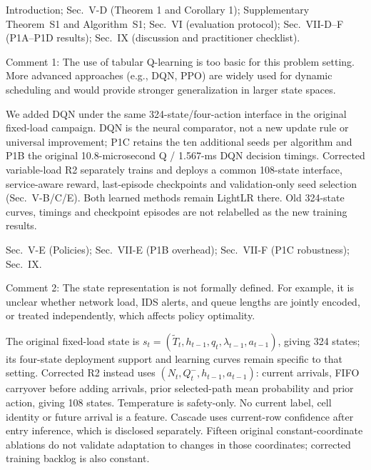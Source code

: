 \documentclass[10pt,a4paper]{article}
\begin{document}
\begin{wherebox}
Introduction; Sec.~V-D (Theorem 1 and Corollary 1); Supplementary Theorem~S1 and Algorithm~S1; Sec.~VI (evaluation protocol); Sec.~VII-D--F (P1A--P1D results); Sec.~IX (discussion and practitioner checklist).
\end{wherebox}

\begin{rcommentbox}
Comment 1: The use of tabular Q-learning is too basic for this problem setting. More advanced approaches (e.g., DQN, PPO) are widely used for dynamic scheduling and would provide stronger generalization in larger state spaces.
\end{rcommentbox}

\begin{authorresponsebox}
We added DQN under the same 324-state/four-action interface in the original fixed-load campaign. DQN is the neural comparator, not a new update rule or universal improvement; P1C retains the ten additional seeds per algorithm and P1B the original 10.8-microsecond Q / 1.567-ms DQN decision timings. Corrected variable-load R2 separately trains and deploys a common 108-state interface, service-aware reward, last-episode checkpoints and validation-only seed selection (Sec.~V-B/C/E). Both learned methods remain LightLR there. Old 324-state curves, timings and checkpoint episodes are not relabelled as the new training results.
\end{authorresponsebox}

\begin{wherebox}
Sec.~V-E (Policies); Sec.~VII-E (P1B overhead); Sec.~VII-F (P1C robustness); Sec.~IX.
\end{wherebox}

\begin{rcommentbox}
Comment 2: The state representation is not formally defined. For example, it is unclear whether network load, IDS alerts, and queue lengths are jointly encoded, or treated independently, which affects policy optimality.
\end{rcommentbox}

\begin{authorresponsebox}
The original fixed-load state is $s_t=(\widetilde T_t,h_{t-1},q_t,\lambda_{t-1},a_{t-1})$, giving 324 states; its four-state deployment support and learning curves remain specific to that setting. Corrected R2 instead uses $(N_t,Q_t^-,h_{t-1},a_{t-1})$: current arrivals, FIFO carryover before adding arrivals, prior selected-path mean probability and prior action, giving 108 states. Temperature is safety-only. No current label, cell identity or future arrival is a feature. Cascade uses current-row confidence after entry inference, which is disclosed separately. Fifteen original constant-coordinate ablations do not validate adaptation to changes in those coordinates; corrected training backlog is also constant.
\end{authorresponsebox}
\end{document}
